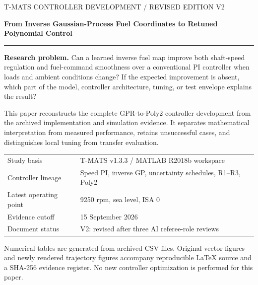 \documentclass[11pt,a4paper,oneside]{report}
\begin{document}
\begin{titlepage}
\color{navy}\sffamily
{\small T-MATS CONTROLLER DEVELOPMENT / REVISED EDITION V2}\par\vspace{17mm}
{\fontsize{29}{35}\selectfont\bfseries From Inverse Gaussian-Process Fuel Coordinates to Retuned Polynomial Control\par}
\vspace{10mm}{\Large Algorithms, evidence, limitations, and lessons from a sequential gas-turbine simulation study\par}
\vspace{9mm}\textcolor{teal}{\rule{\linewidth}{1.2pt}}\vspace{9mm}
\normalfont\color{black}
\textbf{Research problem.} Can a learned inverse fuel map improve both shaft-speed regulation and fuel-command smoothness over a conventional PI controller when loads and ambient conditions change? If the expected improvement is absent, which part of the model, controller architecture, tuning, or test envelope explains the result?

This paper reconstructs the complete GPR-to-Poly2 controller development from the archived implementation and simulation evidence. It separates mathematical interpretation from measured performance, retains unsuccessful cases, and distinguishes local tuning from transfer evaluation.

\vspace{8mm}
\begin{tabular}{@{}ll@{}}
Study basis & T-MATS v1.3.3 / MATLAB R2018b workspace\\[4pt]
Controller lineage & Speed PI, inverse GP, uncertainty schedules, R1--R3, Poly2\\[4pt]
Latest operating point & 9250 rpm, sea level, ISA 0\\[4pt]
Evidence cutoff & 15 September 2026\\[4pt]
Document status & V2: revised after three AI referee-role reviews
\end{tabular}
\vfill
\small Numerical tables are generated from archived CSV files. Original vector figures and newly rendered trajectory figures accompany reproducible LaTeX source and a SHA-256 evidence register. No new controller optimization is performed for this paper.
\end{titlepage}
\end{document}
